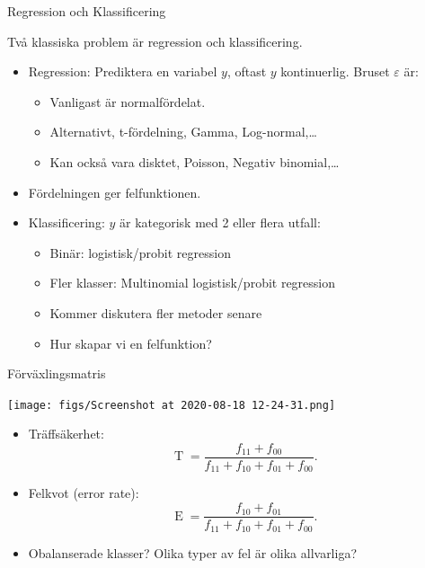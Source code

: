 \documentclass[10pt,english]{beamer}
\begin{document}
\begin{frame}{Regression och Klassificering}
    
    Två klassiska problem är regression och klassificering.

    \begin{itemize}
        \item Regression: Prediktera en variabel $y$, oftast $y$ kontinuerlig. Bruset $\varepsilon$ är:
        \begin{itemize}
            \item Vanligast är normalfördelat.
            \item Alternativt, t-fördelning, Gamma, Log-normal,\dots
            \item Kan också vara disktet, Poisson, Negativ binomial,\dots
        \end{itemize}
        \item Fördelningen ger felfunktionen.
        \item Klassificering: $y$ är kategorisk med 2 eller flera utfall:
        \begin{itemize}
            \item Binär: logistisk/probit regression
            \item Fler klasser: Multinomial logistisk/probit regression
            \item Kommer diskutera fler metoder senare
            \item Hur skapar vi en felfunktion?
        \end{itemize}
    \end{itemize}

\end{frame}

\begin{frame}{Förväxlingsmatris}
\begin{center}
    \texttt{[image: figs/Screenshot at 2020-08-18 12-24-31.png]}
\end{center}

\begin{itemize}
    \item Träffsäkerhet:
    \begin{equation*}
        \operatorname{T} = \frac{f_{11} + f_{00}}{f_{11} + f_{10} + f_{01} + f_{00}}.
    \end{equation*}
    \item Felkvot (error rate):
    \begin{equation*}
        \operatorname{E} = \frac{f_{10} + f_{01}}{f_{11} + f_{10} + f_{01} + f_{00}}.
    \end{equation*}
    \item Obalanserade klasser? Olika typer av fel är olika allvarliga?
\end{itemize}
    
\end{frame}
\end{document}
